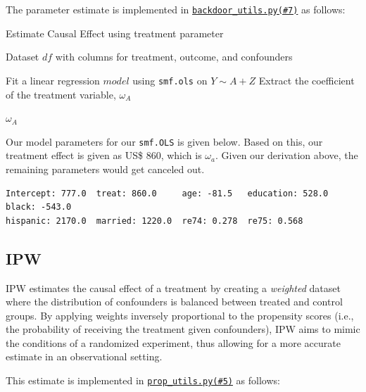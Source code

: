 \documentclass[12pt]{article}
\begin{document}
The parameter estimate is implemented in \href{https://github.com/cs396s24/Proj-Job-Training/blob/main/utils/backdoor_utils.py#L7}{{\tt backdoor\_utils.py(\#7)}} as follows:

\begin{algorithm}[H]
\caption{Estimate Causal Effect using treatment parameter}
\begin{algorithmic}[1]
\Require Dataset $df$ with columns for treatment, outcome, and confounders

\State Fit a linear regression $model$ using {\tt smf.ols} on $Y \sim A + Z$
\State Extract the coefficient of the treatment variable, $\omega_{A}$

\State \Return $\omega_{A}$
\end{algorithmic}
\end{algorithm}

Our model parameters for our \texttt{smf.OLS} is given below. Based on this, our treatment effect is given as US\$ 860, which is $\omega_a$. Given our derivation above, the remaining parameters would get canceled out.

\begin{verbatim}
Intercept: 777.0  treat: 860.0     age: -81.5   education: 528.0    black: -543.0
hispanic: 2170.0  married: 1220.0  re74: 0.278  re75: 0.568
\end{verbatim}

\subsection{IPW}

IPW estimates the causal effect of a treatment by creating a \textit{weighted} dataset where the distribution of confounders is balanced between treated and control groups. By applying weights inversely proportional to the propensity scores (i.e., the probability of receiving the treatment given confounders), IPW aims to mimic the conditions of a randomized experiment, thus allowing for a more accurate estimate in an observational setting.

This estimate is implemented in \href{https://github.com/cs396s24/Proj-Job-Training/blob/main/utils/prop_utils.py#L5}{{\tt prop\_utils.py(\#5)}} as follows:
\end{document}
